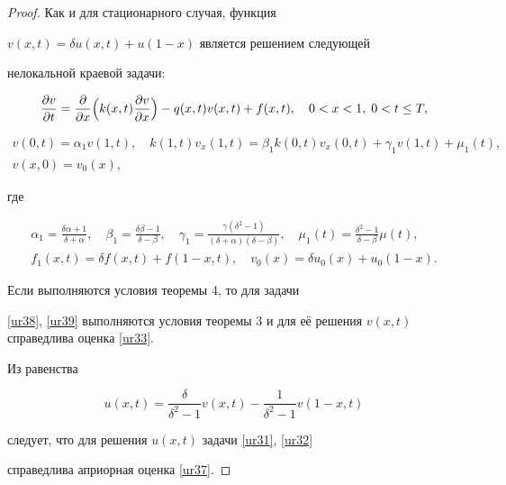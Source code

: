 \begin{proof} Как и для стационарного случая, функция

$v(x,t)=\delta u(x,t)+u(1-x)$ является решением следующей

нелокальной краевой задачи:

\begin{equation}

\frac{\partial v}{\partial t}=\frac{\partial}{\partial x}\Bigl(k(x,t)\frac{\partial v}{\partial

x}\Bigr)-q(x,t)v(x,t)+f(x,t), \quad 0<x<1,\; 0<t\leq T,

\label{ur38}

\end{equation}

\begin{equation}

\begin{array}{c}

v(0,t)=\alpha_1 v(1,t),\quad  k(1,t)v_x(1,t)=\beta_1 k(0,t)v_x(0,t)+\gamma_1 v(1,t)+\mu_1(t), \\

v(x, 0)=v_0(x), 

\end{array}

\label{ur39}

\end{equation}

где

\begin{gather*}

\alpha_1=\frac{\delta\alpha+1}{\delta+\alpha},\quad

\beta_1=\frac{\delta\beta-1}{\delta-\beta},\quad

\gamma_1=\frac{\gamma(\delta^2-1)}{(\delta+\alpha)(\delta-\beta)},

\quad 

\mu_1(t)=\frac{\delta^2-1}{\delta-\beta}\mu(t),

\\

f_1(x,t)=\delta f(x,t)+f(1-x,t),

 \quad v_0(x)=\delta

u_0(x)+u_0(1-x).

\end{gather*}



Если выполняются условия теоремы 4, то для задачи

\eqref{ur38}, \eqref{ur39} выполняются условия теоремы 3 и для её решения $v(x,t)$  справедлива оценка \eqref{ur33}. 

Из равенства

$$

u(x,t)=\frac{\delta}{\delta^2-1}v(x,t)-\frac{1}{\delta^2-1}v(1-x,t)

$$

следует, что для решения $u(x,t)$ задачи \eqref{ur31}, \eqref{ur32}

справедлива априорная оценка \eqref{ur37}.

\end{proof}



